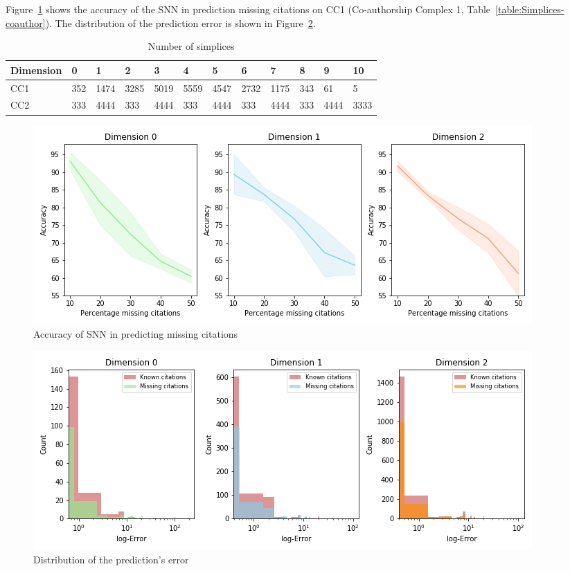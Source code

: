Figure~\ref{fig:accuracy} shows the accuracy of the SNN in prediction missing citations on CC1 (Co-authorship Complex 1, Table~\ref{table:Simplices-coauthor}). The distribution of the prediction error is shown in Figure~\ref{fig:error}. 
\begin{table}
  \caption{%
  Number of simplices
  }
  \label{Simplices-coauthor}
  \centering
  \begin{tabular}{llllllllllll}
    \cmidrule(r){1-12}
    Dimension   & 0     & 1  & 2     & 3 & 4     & 5 & 6    & 7 & 8   & 9 & 10\\
    \midrule
    CC1 & 352  & 1474  & 3285  & 5019  & 5559  & 4547  & 2732  & 1175  & 343 & 61 & 5\\
    CC2 & 333 & 4444 & 333 & 4444 & 333 & 4444  & 333 & 4444  & 333 & 4444 &3333\\ 
    \bottomrule
  \end{tabular}
\end{table}
 
\begin{figure}[htbp]
  \centering 
\includegraphics[scale=0.4]{./figures/accuracy_network1.png}
 \caption{Accuracy of SNN in predicting missing citations } \label{fig:accuracy}
\end{figure}
\begin{figure}[htbp]

  \centering
 \hspace{-6cm}
 
\includegraphics[scale=0.4]{./figures/Error_dist_start150250_seed6666_notsee40.png}
  \caption{Distribution of the prediction's error} \label{fig:error}
\end{figure}

